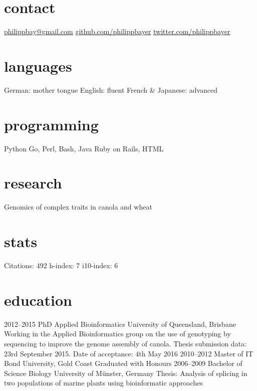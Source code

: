 \documentclass[]{friggeri-cv} %
\begin{document}


\begin{aside} %
\section{contact}
\href{mailto:philippbay@gmail.com}{philippbay@gmail.com}
\href{http://github.com/philippbayer}{github.com/philippbayer}
\href{http://twitter.com/philippbayer}{twitter.com/philippbayer}
\section{languages}
German: mother tongue
English: fluent
French \& Japanese: advanced
\section{programming}
Python
Go, Perl, Bash, Java
Ruby on Rails, HTML
\section{research}
Genomics of complex traits in canola and wheat
\section{stats}
Citations: 492
h-index: 7
i10-index: 6
\end{aside}


\section{education}

\begin{entrylist}
\entry
{2012--2015}
{PhD {\normalfont Applied Bioinformatics}}
{University of Queensland, Brisbane}
{Working in the Applied Bioinformatics group on the use of genotyping by sequencing to improve the genome assembly of canola. Thesis submission data: 23rd September 2015. Date of acceptance: 4th May 2016}
\entry
{2010--2012}
{Master {\normalfont of IT}}
{Bond University, Gold Coast}
{Graduated with Honours}
\entry
{2006--2009}
{Bachelor of Science {\normalfont Biology}}
{University of Münster, Germany}
{Thesis: Analysis of splicing in two populations of marine plants
using bioinformatic approaches}
\end{entrylist}
\end{document}
